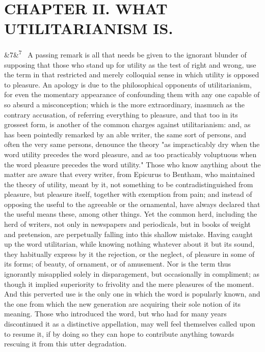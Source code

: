 \documentclass[12pt]{article}
\newcommand{\para}[1][]{\par\noindent\ifx&#1&\else\textsuperscript{\footnotesize #1}~\fi}
\begin{document}
\section*{CHAPTER II. WHAT UTILITARIANISM IS.}

\para[7] A passing remark is all that needs be given to the ignorant blunder of supposing that those who stand up for utility as the test of right and wrong, use the term in that restricted and merely colloquial sense in which utility is opposed to pleasure. An apology is due to the philosophical opponents of utilitarianism, for even the momentary appearance of confounding them with any one capable of so absurd a misconception; which is the more extraordinary, inasmuch as the contrary accusation, of referring everything to pleasure, and that too in its grossest form, is another of the common charges against utilitarianism: and, as has been pointedly remarked by an able writer, the same sort of persons, and often the very same persons, denounce the theory "as impracticably dry when the word utility precedes the word pleasure, and as too practicably voluptuous when the word pleasure precedes the word utility." Those who know anything about the matter are aware that every writer, from Epicurus to Bentham, who maintained the theory of utility, meant by it, not something to be contradistinguished from pleasure, but pleasure itself, together with exemption from pain; and instead of opposing the useful to the agreeable or the ornamental, have always declared that the useful means these, among other things. Yet the common herd, including the herd of writers, not only in newspapers and periodicals, but in books of weight and pretension, are perpetually falling into this shallow mistake. Having caught up the word utilitarian, while knowing nothing whatever about it but its sound, they habitually express by it the rejection, or the neglect, of pleasure in some of its forms; of beauty, of ornament, or of amusement. Nor is the term thus ignorantly misapplied solely in disparagement, but occasionally in compliment; as though it implied superiority to frivolity and the mere pleasures of the moment. And this perverted use is the only one in which the word is popularly known, and the one from which the new generation are acquiring their sole notion of its meaning. Those who introduced the word, but who had for many years discontinued it as a distinctive appellation, may well feel themselves called upon to resume it, if by doing so they can hope to contribute anything towards rescuing it from this utter degradation.
\end{document}
